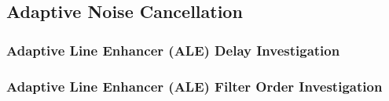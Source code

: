 \documentclass[12pt]{article}
\begin{document}
	\subsection{Adaptive Noise Cancellation} \label{sec: 2-3-ANC}
		\begin{minipage}[b]{0.49\textwidth}
			\subsubsection{Adaptive Line Enhancer (ALE) Delay Investigation}
			
			\subsubsection{Adaptive Line Enhancer (ALE) Filter Order Investigation}
			
		\end{minipage}%
		\begin{minipage}{0.04\textwidth}
			\hspace*{0.04\textwidth}
		\end{minipage}%
\end{document}
